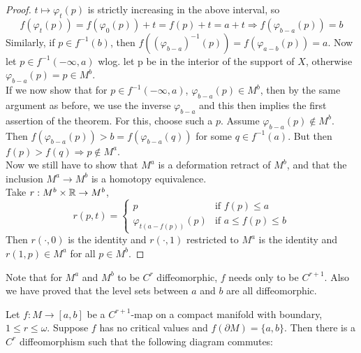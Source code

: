 \begin{proof}
   $t \mapsto \varphi_t(p)$ is strictly increasing in the above interval, so 
   \[ f(\varphi_t(p)) = f(\varphi_0(p)) + t = f(p) + t 
   = a + t \Rightarrow f(\varphi_{b-a}(p)) = b \]
   Similarly, if $p \in f^{-1}(b)$, then 
   $f((\varphi_{b-a})^{-1}(p)) = f(\varphi_{a-b}(p)) = a$. 
   Now let $p \in f^{-1}(-\infty, a)$ wlog. let p be in the interior of the 
   support of $X$, otherwise $\varphi_{b-a}(p) = p \in M^b$. \\
   If we now show that for $p \in f^{-1}(-\infty, a)$, $\varphi_{b-a}(p) \in M^b$,
   then by the same argument as before, we use the inverse $\varphi_{b-a}$ and
   this then implies the first assertion of the theorem. For this, choose such a
   $p$. Assume $\varphi_{b-a}(p) \notin M^b$. Then 
   $f(\varphi_{b-a}(p)) > b = f(\varphi_{b-a}(q))$ for some $q \in f^{-1}(a)$.
   But then $f(p) > f(q) \Rightarrow p \notin M^a$. \\
   Now we still have to show that $M^a$ is a deformation retract of $M^b$, and 
   that the inclusion $M^a \rightarrow M^b$ is a homotopy equivalence. \\
   Take $r: M^b \times {\mathbb R} \rightarrow M^b$, 
   \[ 
      r(p, t) = \begin{cases}
         p & \text{if } f(p) \leq a \\
         \varphi_{t(a - f(p))}(p) & \text{if } a \leq f(p) \leq b
      \end{cases}
   \]
   Then $r(\cdot, 0)$ is the identity and $r(\cdot, 1)$ restricted to $M^a$ is
   the identity and $r(1, p) \in M^a$ for all $p \in M^b$. 
\end{proof}

\begin{remark}
   Note that for $M^a$ and $M^b$ to be $C^r$ diffeomorphic, $f$ needs only to be
   $C^{r+1}$. Also we have proved that the level sets between $a$ and $b$ are
   all diffeomorphic.
\end{remark}

\begin{corollary}[Hirsch]
   Let $f: M \rightarrow [a, b]$ be a $C^{r+1}$-map on a compact manifold with 
   boundary, $1 \leq r \leq \omega$. Suppose $f$ has no critical values and 
   $f(\partial M) = \{a, b\}$. Then there is a $C^r$ diffeomorphism such that the 
   following diagram commutes:
   \begin{figure}[H]
      \centering
   \end{figure}
\end{corollary}

